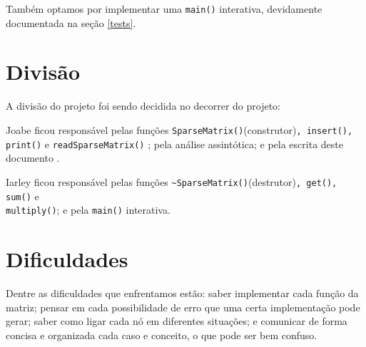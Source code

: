 \documentclass[12pt, letterpaper]{article}
\begin{document}
		Também optamos por implementar uma \verb|main()| interativa, devidamente documentada na seção \ref{tests}.
	\section{Divisão} \label{div}
		A divisão do projeto foi sendo decidida no decorrer do projeto:
		
		Joabe ficou responsável pelas funções \verb|SparseMatrix()|(construtor)\verb|, insert(), print()| e \verb|readSparseMatrix()| \cite{ArquivosCFB2017, CppFilesShmeowlex2021}; pela análise assintótica; e pela escrita deste documento \cite{LearnOverleaf2022}.

		Iarley ficou responsável pelas funções \verb|~SparseMatrix()|(destrutor)\verb|, get(), sum()| e \\ \verb|multiply()|; e pela \verb|main()| interativa.
	\section{Dificuldades} \label{difc}
		Dentre as dificuldades que enfrentamos estão: saber implementar cada função da matriz; pensar em cada possibilidade de erro que uma certa implementação pode gerar; saber como ligar cada nó em diferentes situações; e comunicar de forma concisa e organizada cada caso e conceito, o que pode ser bem confuso.
\end{document}
